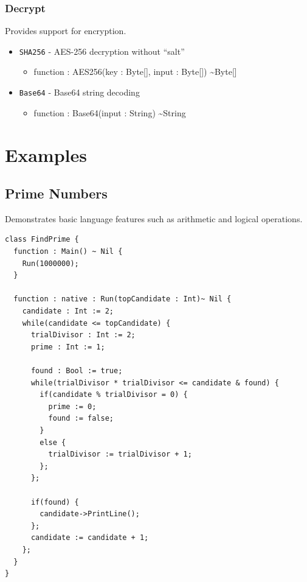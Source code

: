 \documentclass[11pt]{article}
\begin{document}
\subsubsection{Decrypt}
Provides support for encryption.

\begin{itemize}
\item \texttt{SHA256} - AES-256 decryption without ``salt''
  \begin{itemize}
  \item function : AES256(key : Byte[], input : Byte[])
    \textasciitilde Byte[]
  \end{itemize}
\item \texttt{Base64} - Base64 string decoding 
  \begin{itemize}
  \item function : Base64(input : String) \textasciitilde String
  \end{itemize}
\end{itemize}


\newpage


\section{Examples}
\subsection{Prime Numbers}
Demonstrates basic language features such as arithmetic and logical
operations.
\begingroup
\fontsize{8pt}{9pt}\selectfont
\begin{verbatim}
class FindPrime {
  function : Main() ~ Nil {
    Run(1000000);
  }

  function : native : Run(topCandidate : Int)~ Nil {
    candidate : Int := 2;
    while(candidate <= topCandidate) {
      trialDivisor : Int := 2;
      prime : Int := 1;

      found : Bool := true;
      while(trialDivisor * trialDivisor <= candidate & found) {
        if(candidate % trialDivisor = 0) {
          prime := 0;
          found := false;
        }
        else {
          trialDivisor := trialDivisor + 1;
        };
      };

      if(found) {
        candidate->PrintLine();
      };
      candidate := candidate + 1;
    };
  }
}
\end{verbatim}
\endgroup
\end{document}
